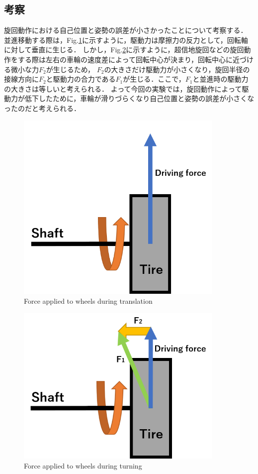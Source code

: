 \documentclass[a4paper,11pt]{jsarticle}
\begin{document}
\newpage

\subsection{考察}
旋回動作における自己位置と姿勢の誤差が小さかったことについて考察する．
並進移動する際は，Fig.\ref{T_f1}に示すように，駆動力は摩擦力の反力として，回転軸に対して垂直に生じる．
しかし，Fig.\ref{T_f2}に示すように，超信地旋回などの旋回動作をする際は左右の車輪の速度差によって回転中心が決まり，回転中心に近づける微小な力$F_2$が生じるため，
$F_2$の大きさだけ駆動力が小さくなり，旋回半径の接線方向に$F_2$と駆動力の合力である$F_1$が生じる．ここで，$F_1$と並進時の駆動力の大きさは等しいと考えられる．
よって今回の実験では，旋回動作によって駆動力が低下したために，車輪が滑りづらくなり自己位置と姿勢の誤差が小さくなったのだと考えられる．

\begin{figure}[H]\centering
\includegraphics[width=100mm]{figure/Tire_force1.png}
\caption{Force applied to wheels during translation}
\label{T_f1}\vspace{0zh}\end{figure}

\begin{figure}[H]\centering
\includegraphics[width=100mm]{figure/Tire_force2.png}
\caption{Force applied to wheels during turning}
\label{T_f2}\vspace{0zh}\end{figure}
\end{document}
